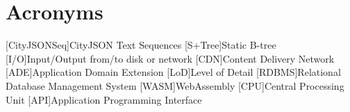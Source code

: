 
\chapter*{Acronyms}

\begin{acronym}[UML]
  [CityJSONSeq]{CityJSON Text Sequences}
  [S+Tree]{Static B-tree}
  [I/O]{Input/Output from/to disk or network}
  [CDN]{Content Delivery Network}
  [ADE]{Application Domain Extension}
  [LoD]{Level of Detail}
  [RDBMS]{Relational Database Management System}
  [WASM]{WebAssembly}
  [CPU]{Central Processing Unit}
  [API]{Application Programming Interface}
\end{acronym}